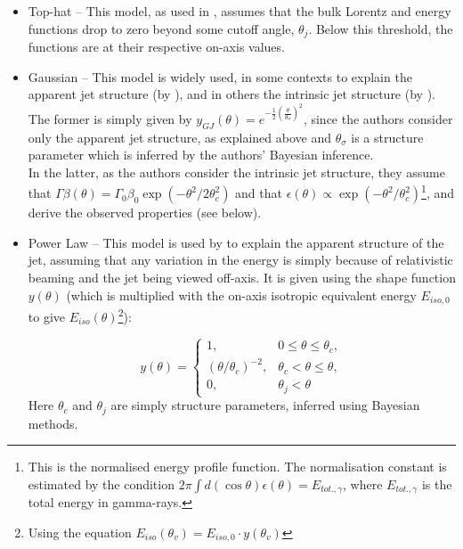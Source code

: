     \begin{itemize}

        \item Top-hat -- This model, as used in \cite{saleem_2020b}, assumes
            that the bulk Lorentz and energy functions drop to zero beyond some cutoff
            angle, $\theta_j$. Below this threshold, the functions are at their
            respective on-axis values.

       \item Gaussian -- This model is widely used, in some contexts to explain the
           apparent jet structure (by \cite{hayes_2020}), and in others the
           intrinsic jet structure (by \cite{saleem_2020b}). The former is
           simply given by $y_{GJ}(\theta) = e^{- \frac{1}{2} \left(
           \frac{\theta}{\theta_{\sigma}} \right)^2}$, since the authors consider only
           the apparent jet structure, as explained above and $\theta_\sigma$ is a
           structure parameter which is inferred by the authors' Bayesian inference.\\
           In the latter, as the authors consider the intrinsic jet structure, they
           assume that $\Gamma \beta (\theta) = \Gamma_0 \beta_0 \exp\left(- \theta^2 /
           2\theta_c^2\right)$ and that $\epsilon (\theta) \propto \exp(- \theta^2 /
           \theta_c^2)$\footnote{This is the normalised energy profile function.  The
               normalisation constant is estimated by the condition $2\pi \int d(\cos
               \theta) \epsilon(\theta) = E_{tot., \gamma}$, where $E_{tot., \gamma}$ is
           the total energy in gamma-rays.}, and derive the observed properties (see
           below).

        \item Power Law -- This model is used by \cite{hayes_2020} to explain
            the apparent structure of the jet, assuming that any variation in the energy
            is simply because of relativistic beaming and the jet being viewed off-axis.
            It is given using the shape function $y(\theta)$ (which is multiplied with
            the on-axis isotropic equivalent energy $E_{iso, 0}$ to give
            $E_{iso}(\theta)$\footnote{Using the equation $E_{iso}(\theta_v) = E_{iso,
            0} \cdot y(\theta_v)$}):

                \begin{equation}
                    \label{eq:5}
                    y(\theta) = \begin{cases}
                                    1,
                                        & 0 \leq \theta \leq \theta_c, \\
                                    (\theta/\theta_c)^{-2},
                                        & \theta_c < \theta \leq \theta, \\
                                    0,
                                        & \theta_j < \theta
                                \end{cases}
                \end{equation}
                Here $\theta_c$ and $\theta_j$ are simply structure parameters, inferred
                using Bayesian methods.


\end{itemize}

